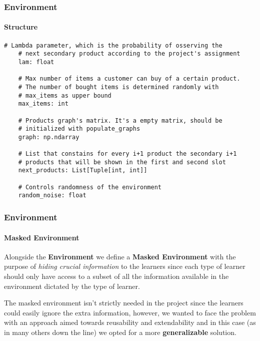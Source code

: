 \documentclass[11pt]{beamer}
\begin{document}

\begin{frame}[fragile]

\frametitle{Environment}
\framesubtitle{Structure}

\begin{lstlisting}[style=Python, basicstyle=\tiny, numbers=none, framexrightmargin=-20pt]
    # Lambda parameter, which is the probability of osserving the
    # next secondary product according to the project's assignment
    lam: float

    # Max number of items a customer can buy of a certain product.
    # The number of bought items is determined randomly with
    # max_items as upper bound
    max_items: int

    # Products graph's matrix. It's a empty matrix, should be
    # initialized with populate_graphs
    graph: np.ndarray

    # List that constains for every i+1 product the secondary i+1
    # products that will be shown in the first and second slot
    next_products: List[Tuple[int, int]]

    # Controls randomness of the environment
    random_noise: float
\end{lstlisting}

\end{frame}


\begin{frame}

\frametitle{Environment}
\framesubtitle{Masked Environment}

Alongside the \textbf{Environment} we define a \textbf{Masked Environment} with the purpose of \textit{hiding crucial information} to the learners since each type of learner should only have access to a subset of all the information available in the environment dictated by the type of learner.

The masked environment isn't strictly needed in the project since the learners could easily ignore the extra information, however, we wanted to face the problem with an approach aimed towards reusability and extendability and in this case (as in many others down the line) we opted for a more \textbf{generalizable} solution.


\end{frame}
\end{document}
